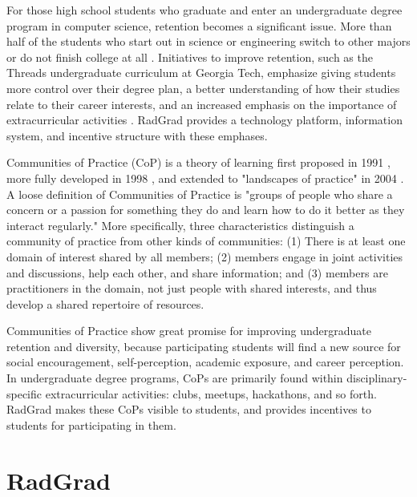 \documentclass[acmsmall]{acmart}
\begin{document}
For those high school students who graduate and enter an undergraduate degree program in computer science, retention becomes a significant issue.   More than half of the students who start out in science or engineering switch to other majors or do not finish college at all \cite{kober_reaching_2015}. Initiatives to improve retention, such as the Threads undergraduate curriculum at Georgia Tech, emphasize giving students more control over their degree plan, a better understanding of how their studies relate to their career interests, and an increased emphasis on the importance of extracurricular activities \cite{barrett_expanding_2017}. RadGrad provides a technology platform, information system, and incentive structure with these emphases.

Communities of Practice (CoP) is a theory of learning first proposed in 1991 \cite{lave_situated_1991}, more fully developed in 1998 \cite{wenger_communities_1998}, and extended to "landscapes of practice" in 2004 \cite{wenger_learning_2004}. A loose definition of Communities of Practice is "groups of people who share a concern or a passion for something they do and learn how to do it better as they interact regularly." More specifically, three characteristics distinguish a community of practice from other kinds of communities: (1) There is at least one domain of interest shared by all members; (2) members engage in joint activities and discussions, help each other, and share information;  and (3) members are practitioners in the domain, not just people with shared interests, and thus develop a shared repertoire of resources.

Communities of Practice show great promise for improving undergraduate retention and diversity, because participating students will find a new source for social encouragement, self-perception, academic exposure, and career perception. In undergraduate degree programs, CoPs are primarily found within disciplinary-specific extracurricular activities: clubs, meetups, hackathons, and so forth. RadGrad makes these CoPs visible to students, and provides incentives to students for participating in them.


\section{RadGrad}
\label{sec:radgrad}
\end{document}
